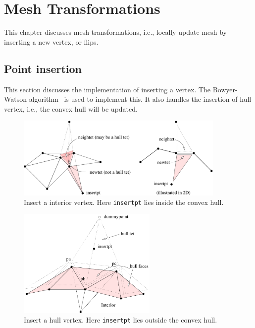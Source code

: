\chapter{Mesh Transformations}

This chapter discusses mesh transformations, i.e., locally update mesh by inserting a new vertex, or flips.

\section{Point insertion}

This section discusses the implementation of inserting a vertex. The Bowyer-Watson algorithm~\cite{Bowyer81, Watson81} is used to implement this. It also handles the insertion of hull vertex, i.e., the convex hull will be updated.

\begin{figure}
  \centering
  \includegraphics[width=0.9\textwidth]{../figs/bowyerwatson1}
\caption{Insert a interior vertex. Here {\tt insertpt} lies inside the convex hull.}
\label{fig:bowyerwatson1}
\end{figure}

\begin{figure}
  \centering
  \includegraphics[width=0.6\textwidth]{../figs/inserthullvertex}
\caption{Insert a hull vertex. Here {\tt insertpt} lies outside the convex hull. }
\label{fig:inserthullvertex}
\end{figure}


